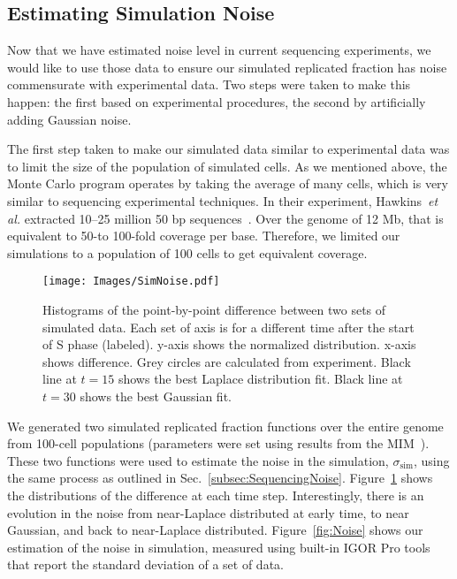 		
		\subsection{Estimating Simulation Noise}
		\label{subsec:SimulationNoise}
		
		Now that we have estimated noise level in current sequencing experiments, we would like to use those data to ensure our simulated replicated fraction has noise commensurate with experimental data.
		Two steps were taken to make this happen: the first based on experimental procedures, the second by artificially adding Gaussian noise.
		
		The first step taken to make our simulated data similar to experimental data was to limit the size of the population of simulated cells.
		As we mentioned above, the Monte Carlo program operates by taking the average of many cells, which is very similar to sequencing experimental techniques.
		In their experiment, Hawkins~\emph{et al.} extracted 10--25 million 50 bp sequences~\cite{StochasticTermination}.
		Over the genome of 12 Mb, that is equivalent to 50-to 100-fold coverage per base.
		Therefore, we limited our simulations to a population of 100 cells to get equivalent coverage.
		
		\begin{figure}[tbh]
			\begin{center}
				\texttt{[image: Images/SimNoise.pdf]}
			\end{center}
				\caption[Estimating Simulation Noise: Point-By-Point Difference Distributions]{\label{fig:SimNoise} Histograms of the point-by-point difference between two sets of simulated data.
					Each set of axis is for a different time after the start of S phase (labeled).
					y-axis shows the normalized distribution.
					x-axis shows difference.
					Grey circles are calculated from experiment.
					Black line at $t=15$ shows the best Laplace distribution fit.
					Black line at $t=30$ shows the best Gaussian fit.
				}
		\end{figure}
		
		We generated two simulated replicated fraction functions over the entire genome from 100-cell populations (parameters were set using results from the MIM~\cite{ScottsPaper}).
		These two functions were used to estimate the noise in the simulation, $\sigma_\text{sim}$, using the same process as outlined in Sec.~\ref{subsec:SequencingNoise}.
		Figure~\ref{fig:SimNoise} shows the distributions of the difference at each time step.
		Interestingly, there is an evolution in the noise from near-Laplace distributed at early time, to near Gaussian, and back to near-Laplace distributed.
		Figure~\ref{fig:Noise} shows our estimation of the noise in simulation, measured using built-in IGOR Pro tools that report the standard deviation of a set of data.
		
